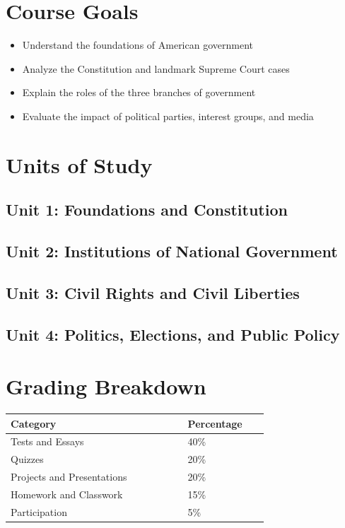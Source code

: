 \documentclass[12pt,oneside]{book}
\begin{document}
\section{Course Goals}
\begin{itemize}[leftmargin=2em]
    \item Understand the foundations of American government
    \item Analyze the Constitution and landmark Supreme Court cases
    \item Explain the roles of the three branches of government
    \item Evaluate the impact of political parties, interest groups, and media
\end{itemize}

\section{Units of Study}
\subsection*{Unit 1: Foundations and Constitution}
\subsection*{Unit 2: Institutions of National Government}
\subsection*{Unit 3: Civil Rights and Civil Liberties}
\subsection*{Unit 4: Politics, Elections, and Public Policy}

\section{Grading Breakdown}
\begin{center}
\begin{tabular}{L{0.55\linewidth}L{0.25\linewidth}}
\toprule
\textbf{Category} & \textbf{Percentage} \\
\midrule
Tests and Essays & 40\% \\
Quizzes & 20\% \\
Projects and Presentations & 20\% \\
Homework and Classwork & 15\% \\
Participation & 5\% \\
\bottomrule
\end{tabular}
\end{center}
\end{document}
